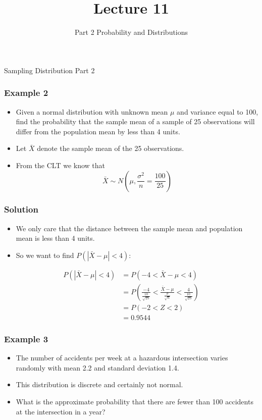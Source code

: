 \documentclass[14pt]{beamer}
\title[ECON2843]{Lecture 11}
\subtitle{Part 2 Probability and Distributions}
\date{}
\begin{document}
	\begin{frame}
		\titlepage
	\end{frame}
	\begin{frame}
		\vspace{1cm}
		\centering
		{\color{blue}\large Sampling Distribution Part 2}
	\end{frame}
\begin{frame}
	\frametitle{Example 2}
	
	\begin{itemize}[label={\color{blue}$\blacktriangleright$}]
		\item Given a normal distribution with unknown mean $\mu$ and variance equal to 100, find the probability that the sample mean of a sample of 25 observations will differ from the population mean by less than 4 units.
		\item Let $\bar{X}$ denote the sample mean of the 25 observations.
		\item From the CLT we know that
		\[
		\bar{X} \sim N \left(\mu, \frac{\sigma^2}{n} = \frac{100}{25}\right)
		\]
	\end{itemize}
	
\end{frame}

\begin{frame}
	\frametitle{Solution}
	
	\begin{itemize}[label={\color{blue}$\blacktriangleright$}]
		\item We only care that the distance between the sample mean and population mean is less than 4 units.
		\item So we want to find $P(|\bar{X} - \mu| < 4)$:
	\end{itemize}
	
	\begin{align*}
		P(|\bar{X} - \mu| < 4) &= P(-4 < \bar{X} - \mu < 4) \\[1ex]
		&= P\left(\frac{-4}{\frac{10}{\sqrt{25}}} < \frac{\bar{X} - \mu}{\frac{\sigma}{\sqrt{n}}} < \frac{4}{\frac{10}{\sqrt{25}}}\right) \\[1ex]
		&= P(-2 < Z < 2) \\[1ex]
		&= 0.9544
	\end{align*}
	
\end{frame}

\begin{frame}
	\frametitle{Example 3}
	
	\begin{itemize}[label={\color{blue}$\blacktriangleright$}]
		\item The number of accidents per week at a hazardous intersection varies randomly with mean 2.2 and standard deviation 1.4.
		\item This distribution is discrete and certainly not normal.
		\item What is the approximate probability that there are fewer than 100 accidents at the intersection in a year?
	\end{itemize}
	
\end{frame}
\end{document}
